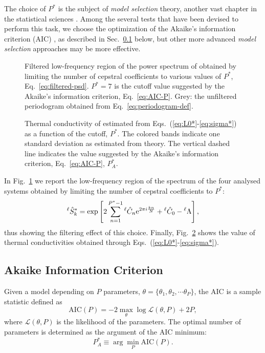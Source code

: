 The choice of $P^*$ is the subject of \emph{model selection} theory, another vast chapter in the statistical sciences \cite{Claeskens2008}. Among the several tests that have been devised to perform this task, we choose the optimization of the Akaike's information criterion (AIC) \cite{Claeskens2008,Akaike1974}, as described in Sec.~\ref{sec:AIC} below, but other more advanced \emph{model selection} approaches \citep{Claeskens2008} may be more effective.

\begin{figure}[!htb]
    \centering
    \caption{
    Filtered low-frequency region of the power spectrum of \LEnote{******} obtained by limiting the number of cepstral coefficients to various values of $P^*$, Eq.~\eqref{eq:filtered-psd}. $P^*=7$ is the cutoff value suggested by the Akaike's information criterion, Eq.~\eqref{eq:AIC-P}. Grey: the unfiltered periodogram obtained from Eq.~\eqref{eq:periodogram-def}.
    }  \label{fig:filtered-psds}
\end{figure}
\begin{figure}[!htb]
    \centering
    \caption{
    Thermal conductivity of \LEnote{******} estimated from Eqs.~(\ref{eq:L0*}-\ref{eq:sigma*}) as a function of the cutoff, $P^*$. The colored bands indicate one standard deviation as estimated from theory. The vertical dashed line indicates the value suggested by the Akaike's information criterion, Eq.~\eqref{eq:AIC-P}, $P_A^*$.
    }  \label{fig:kappa-convergence-Pstar}
\end{figure}

In Fig.~\ref{fig:filtered-psds} we report the low-frequency region of the spectrum of the four analysed systems obtained by limiting the number of cepstral coefficients to $P^*$:
\begin{equation}
    ^\ell\hat{S}_k^* = \exp\left[ 2\sum_{n=1}^{P^*-1} {}^\ell\hat{C}_n \mathrm{e}^{2\pi i \frac{k n}{N}} + {}^\ell\hat{C}_0 - {}^\ell\rLambda\right], \label{eq:filtered-psd}
\end{equation}
thus showing the filtering effect of this choice.
Finally, Fig.~\ref{fig:kappa-convergence-Pstar} shows the value of thermal conductivities obtained through Eqs.~(\ref{eq:L0*}-\ref{eq:sigma*}).


\subsection{Akaike Information Criterion}  \label{sec:AIC}
Given a model depending on $P$ parameters, $\theta = \{\theta_{1}, \theta_{2}, \cdots \theta_{P}\}$, the AIC \cite{Claeskens2008,Akaike1974} is a sample statistic defined as
\begin{equation}
    \mathrm{AIC}(P) =-2\max_{\theta}\log\mathcal{L}(\theta,P)+2P,\label{eq:AIC}
\end{equation}
where $\mathcal{L}(\theta,P)$ is the likelihood of the parameters. The optimal number of parameters is determined as the argument of the AIC minimum:
\begin{equation}
    P_A^* \equiv \arg\min_P\mathrm{AIC}(P) . \label{eq:P*}
\end{equation}

